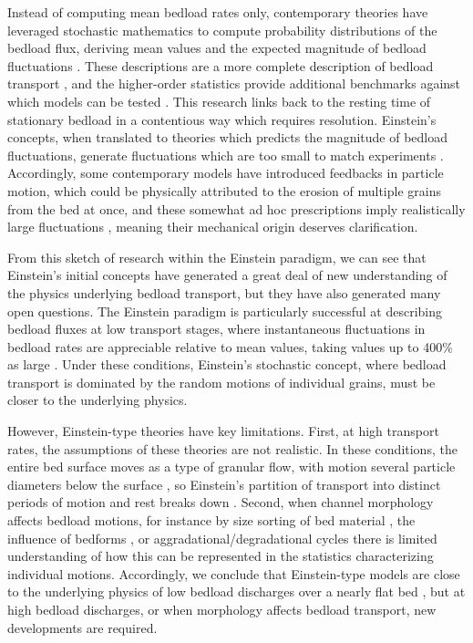 \documentclass{article}
\begin{document}
Instead of computing mean bedload rates only, contemporary theories have leveraged stochastic mathematics \citep{Cox1965} to compute probability distributions of the bedload flux, deriving mean values and the expected magnitude of bedload fluctuations \citep{Sun2000, Ancey2006, Ancey2008}. 
These descriptions are a more complete description of bedload transport \citep{Ancey2008}, and the higher-order statistics provide additional benchmarks against which models can be tested \citep{Iverson2013}. 
This research links back to the resting time of stationary bedload in a contentious way which requires resolution. 
Einstein's concepts, when translated to theories which predicts the magnitude of bedload fluctuations, generate fluctuations which are too small to match experiments \citep{Ancey2006}. 
Accordingly, some contemporary models have introduced feedbacks in particle motion, which could be physically attributed to the erosion of multiple grains from the bed at once, and these somewhat ad hoc prescriptions imply realistically large fluctuations \citep{Ancey2008, Heyman2013, Ma2014}, meaning their mechanical origin deserves clarification. 

From this sketch of research within the Einstein paradigm, we can see that Einstein's initial concepts have generated a great deal of new understanding of the physics underlying bedload transport, but they have also generated many open questions.
The Einstein paradigm is particularly successful at describing bedload fluxes at low transport stages, where instantaneous fluctuations in bedload rates are appreciable relative to mean values, taking values up to 400\% as large \citep{Bohm2004, Ancey2008, Singh2009, Heyman2016, Gonzalez2017}.
Under these conditions, Einstein's stochastic concept, where bedload transport is dominated by the random motions of individual grains, must be closer to the underlying physics. 
 
However, Einstein-type theories have key limitations.
First, at high transport rates, the assumptions of these theories are not realistic. 
In these conditions, the entire bed surface moves as a type of granular flow, with motion several particle diameters below the surface \citep{Jenkins1998, Mouilleron2009, Frey2014, Houssais2015}, so Einstein's partition of transport into distinct periods of motion and rest breaks down \citep{Ancey2008, Heyman2014}.
Second, when channel morphology affects bedload motions, for instance by size sorting of bed material \citep{Nelson2010, Sun2015}, the influence of bedforms \citep{Iseya1987, Cudden2003, Kasprak2014, Hassan2017}, or aggradational/degradational cycles \citep{Dhont2018} there is limited understanding of how this can be represented in the statistics characterizing individual motions. 
Accordingly, we conclude that Einstein-type models are close to the underlying physics of low bedload discharges over a nearly flat bed \citep{Ancey2008, Heyman2013, Ma2014}, but at high bedload discharges, or when morphology affects bedload transport, new developments are required. 
\end{document}

